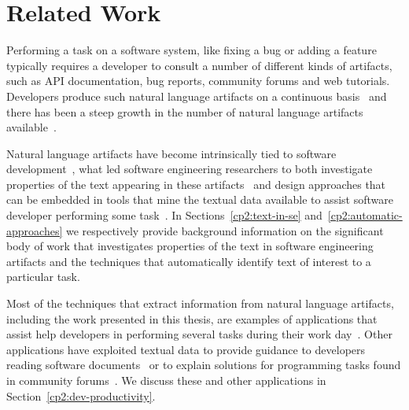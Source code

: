 \setcounter{chapter}{1}


\chapter{Related Work}
\label{ch:related-work}








Performing a task on a software system, like fixing a bug
or adding a feature typically requires a developer to consult
a number of different kinds of artifacts, such
as API documentation, bug reports, community forums
and web tutorials. 
Developers produce such natural language artifacts on a 
continuous basis~\cite{Rastkar2013t} 
and there has been a steep growth in the number 
of natural language artifacts available~\cite{Bavota2016, aa}.


Natural language artifacts have become intrinsically tied to software development~\cite{liu2021},
what led 
 software engineering researchers to both
investigate 
properties of the text 
appearing in these artifacts~\cite{aa}
and design approaches that 
can be embedded in
tools that mine the textual data available to assist software developer performing some task~\cite{aa}.
In Sections~\ref{cp2:text-in-se} and~\ref{cp2:automatic-approaches}
we respectively provide background information on the significant body 
of work that investigates properties of the text in software engineering 
artifacts and the techniques that automatically identify text of interest 
to a particular task.







Most of the techniques that extract information from natural 
language artifacts, including the work presented in this thesis, 
are examples of applications that assist help developers in performing 
several tasks during their work day~\cite{Meyer2017}. 
Other applications have exploited textual data
to provide guidance to developers reading software documents~\cite{Treude2016,  robillard2017} 
or  to  explain solutions for programming tasks found in community forums~\cite{silva2019}.
We discuss these and other applications in Section~\ref{cp2:dev-productivity}.








